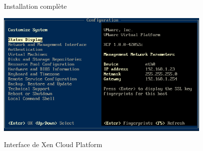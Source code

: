\begin{center}
Installation complète
\end{center}
\begin{center}
\includegraphics[width=300pt]{images/xcp.png}
\end{center}
\begin{center}
Interface de Xen Cloud Platform
\end{center}
